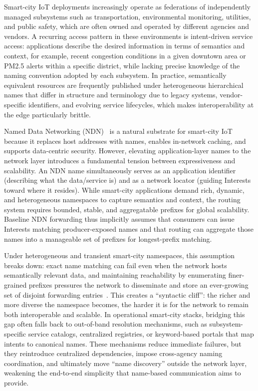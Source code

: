 \documentclass[journal]{IEEEtran}
\begin{document}
Smart-city IoT deployments increasingly operate as federations of independently managed subsystems such as transportation, environmental monitoring, utilities, and public safety, which are often owned and operated by different agencies and vendors. A recurring access pattern in these environments is intent-driven service access: applications describe the desired information in terms of semantics and context, for example, recent congestion conditions in a given downtown area or PM2.5 alerts within a specific district, while lacking precise knowledge of the naming convention adopted by each subsystem. In practice, semantically equivalent resources are frequently published under heterogeneous hierarchical names that differ in structure and terminology due to legacy systems, vendor-specific identifiers, and evolving service lifecycles, which makes interoperability at the edge particularly brittle.

Named Data Networking (NDN)~\cite{ndn} is a natural substrate for smart-city IoT because it replaces host addresses with names, enables in-network caching, and supports data-centric security. However, elevating application-layer names to the network layer introduces a fundamental tension between expressiveness and scalability. An NDN name simultaneously serves as an application identifier (describing what the data/service is) and as a network locator (guiding Interests toward where it resides). While smart-city applications demand rich, dynamic, and heterogeneous namespaces to capture semantics and context, the routing system requires bounded, stable, and aggregatable prefixes for global scalability. Baseline NDN forwarding thus implicitly assumes that consumers can issue Interests matching producer-exposed names and that routing can aggregate those names into a manageable set of prefixes for longest-prefix matching.

Under heterogeneous and transient smart-city namespaces, this assumption breaks down: exact name matching can fail even when the network hosts semantically relevant data, and maintaining reachability by enumerating finer-grained prefixes pressures the network to disseminate and store an ever-growing set of disjoint forwarding entries~\cite{inf_ndn_iot}. This creates a ``syntactic cliff'': the richer and more diverse the namespace becomes, the harder it is for the network to remain both interoperable and scalable. In operational smart-city stacks, bridging this gap often falls back to out-of-band resolution mechanisms, such as subsystem-specific service catalogs, centralized registries, or keyword-based portals that map intents to canonical names. These mechanisms reduce immediate failures, but they reintroduce centralized dependencies, impose cross-agency naming coordination, and ultimately move ``name discovery'' outside the network layer, weakening the end-to-end simplicity that name-based communication aims to provide.
\end{document}
